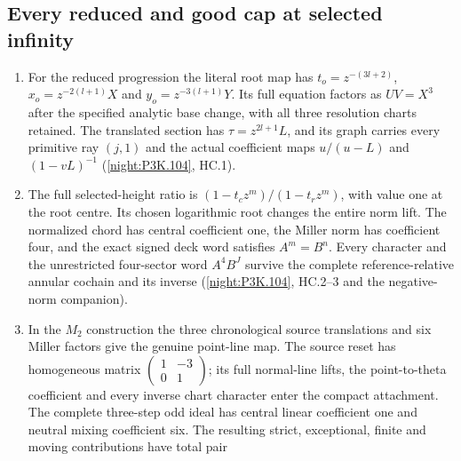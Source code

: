 \subsection{Every reduced and good cap at selected infinity}
\RungOne
\begin{enumerate}[label=\arabic*.]
\item For the reduced progression the literal root map has
  $t_o=z^{-(3l+2)}$, $x_o=z^{-2(l+1)}X$ and
  $y_o=z^{-3(l+1)}Y$. Its full equation factors as
  $UV=X^3$ after the specified analytic base change, with all three
  resolution charts retained. The translated section has
  $\tau=z^{2l+1}L$, and its graph carries every primitive ray
  $(j,1)$ and the actual coefficient maps
  $u/(u-L)$ and $(1-vL)^{-1}$
  (\cref{night:P3K.104}, HC.1).
\item The full selected-height ratio is
  $(1-t_cz^m)/(1-t_rz^m)$, with value one at the root centre.
  Its chosen logarithmic root changes the entire norm lift.
  The normalized chord has central coefficient one, the Miller
  norm has coefficient four, and the exact signed deck word
  satisfies $A^m=B^n$. Every character and the unrestricted
  four-sector word $A^4B^J$ survive the complete reference-relative
  annular cochain and its inverse
  (\cref{night:P3K.104}, HC.2--3 and the negative-norm companion).
\item In the $M_2$ construction the three chronological source
  translations and six Miller factors give the genuine point-line
  map. The source reset has homogeneous matrix
  $\left(\begin{smallmatrix}1&-3\\0&1\end{smallmatrix}\right)$;
  its full normal-line lifts, the point-to-theta coefficient and
  every inverse chart character enter the compact attachment.
  The complete three-step odd ideal has central linear coefficient
  one and neutral mixing coefficient six. The resulting strict,
  exceptional, finite and moving contributions have total pair

\end{enumerate}
